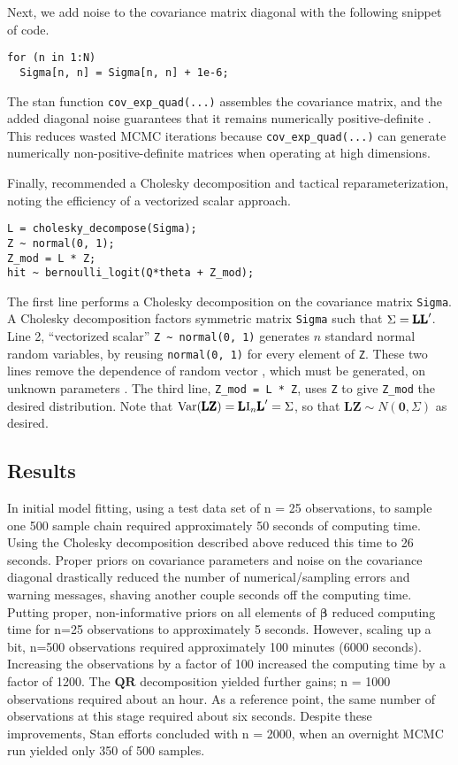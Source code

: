 Next, we add noise to the covariance matrix diagonal with the following snippet of code.
\begin{verbatim}
for (n in 1:N)
  Sigma[n, n] = Sigma[n, n] + 1e-6;
\end{verbatim}
The stan function \verb|cov_exp_quad(...)| assembles the covariance matrix, and the added diagonal noise guarantees that it remains numerically positive-definite \cite{Trangucci2017}. This reduces wasted MCMC iterations because \verb|cov_exp_quad(...)| can generate numerically non-positive-definite matrices when operating at high dimensions.

Finally, \cite{Carpenter} recommended a Cholesky decomposition and tactical reparameterization, noting the efficiency of a vectorized scalar approach.
\begin{verbatim}
L = cholesky_decompose(Sigma);  
Z ~ normal(0, 1);  
Z_mod = L * Z; 
hit ~ bernoulli_logit(Q*theta + Z_mod);
\end{verbatim}
The first line performs a Cholesky decomposition on the covariance matrix \verb|Sigma|. A Cholesky decomposition factors symmetric matrix \verb|Sigma| such that $\Sigma = \text{\pmb{LL}}'$. Line 2, ``vectorized scalar'' \verb|Z ~ normal(0, 1)| generates $n$ standard normal random variables, by reusing \verb|normal(0, 1)| for every element of \verb|Z|. These two lines remove the dependence of random vector , which must be generated, on unknown parameters \cite{Trangucci2017}. The third line, \verb|Z_mod = L * Z|, uses \verb|Z| to give \verb|Z_mod| the desired distribution. Note that $\text{Var}(\text{\pmb{LZ}}) = \text{\pmb{L}} \text{I}_{n}\text{\pmb{L}}' = \Sigma$, so that $\pmb{LZ} \sim N(\pmb{0}, \Sigma)$ as desired.

\subsection{Results}

In initial model fitting, using a test data set of n = 25 observations, to sample one 500 sample chain required approximately 50 seconds of computing time. Using the Cholesky decomposition described above reduced this time to 26 seconds. Proper priors on covariance parameters and noise on the covariance diagonal drastically reduced the number of numerical/sampling errors and warning messages, shaving another couple seconds off the computing time. Putting proper, non-informative priors on all elements of $\pmb{\beta}$ reduced computing time for n=25 observations to approximately 5 seconds. However, scaling up a bit, n=500 observations required approximately 100 minutes (6000 seconds). Increasing the observations by a factor of 100 increased the computing time by a factor of 1200. The $\pmb{QR}$ decomposition yielded further gains; n = 1000 observations required about an hour. As a reference point, the same number of observations at this stage required about six seconds. Despite these improvements, Stan efforts concluded with n = 2000, when an overnight MCMC run yielded only 350 of 500 samples.

